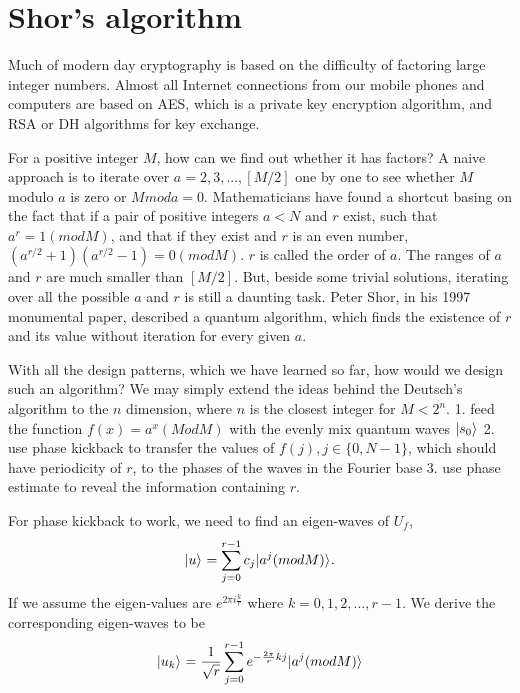 \documentclass[Letter,11pt]{book}
\begin{document}
\section{Shor's algorithm}
Much of modern day cryptography is based on the difficulty of factoring large integer numbers. Almost all Internet connections from our mobile phones and computers are based on AES, which is a private key encryption algorithm, and RSA or DH algorithms for key exchange.

For a positive integer $M$, how can we find out whether it has factors? A naive approach is to iterate over
$a=2, 3, ..., [M/2]$ one by one to see whether $M$ modulo $a$ is zero or $M mod a = 0$. Mathematicians have found a shortcut basing on the fact that if a pair of positive integers $a < N$ and $r$ exist, such that $a^r = 1(mod M)$, and that if they exist and $r$ is an even number, $(a^{r/2}+1)(a^{r/2}-1) = 0 (mod M)$. $r$ is called the order of $a$. The ranges of $a$ and $r$ are much smaller than $[M/2]$. But, beside some trivial solutions, iterating over all the possible $a$ and $r$ is still a daunting task. Peter Shor, in his 1997 monumental paper\cite{1997Shor}, described a quantum algorithm, which finds the existence of $r$ and its value without iteration for every given $a$.

With all the design patterns, which we have learned so far, how would we design such an algorithm? We may simply extend the ideas behind the Deutsch's algorithm to the $n$ dimension, where $n$ is the closest integer for $M < 2^n$.
1. feed the function $f(x) = a^x (Mod M)$ with the evenly mix quantum waves $\vert {s_0} \rangle_{}$
2. use phase kickback to transfer the values of $f(j), j\in \{0,N-1\}$, which should have periodicity of $r$, to the phases of the waves in the Fourier base
3. use phase estimate to reveal the information containing $r$.

For phase kickback to work, we need to find an eigen-waves of $U_f$,
\begin{equation}\label{keta_u}
    \vert {u} \rangle_{} = \sum^{r-1}_{j=0} c_j \vert {a^j (mod M)} \rangle_{}.
\end{equation}
If we assume the eigen-values are $e^{2\pi i \frac k r}$ where $k=0, 1, 2, ..., r-1$. We derive the corresponding eigen-waves to be
\begin{equation}\label{keta_uk}
    \vert {u_k} \rangle_{} = \frac 1 {\sqrt{r}} \sum^{r-1}_{j=0} e^{-{\frac {2\pi} r} kj} \vert {a^j (mod M)} \rangle_{}
\end{equation}
\end{document}
